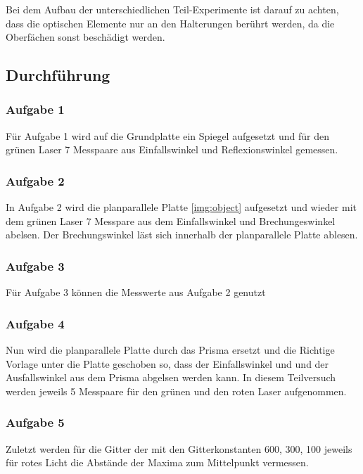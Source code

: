         \noindent
        Bei dem Aufbau der unterschiedlichen Teil-Experimente ist darauf zu achten, dass die optischen Elemente nur an den Halterungen berührt werden, 
        da die Oberfächen sonst beschädigt werden.

    \subsection{Durchführung}

        \subsubsection{Aufgabe 1}

            \noindent
            Für Aufgabe 1 wird auf die Grundplatte ein Spiegel aufgesetzt und für den grünen Laser 7 Messpaare aus Einfallswinkel und Reflexionswinkel
            gemessen.

        \subsubsection{Aufgabe 2}
            
            \noindent In Aufgabe 2 wird die planparallele Platte \ref{img:object} aufgesetzt und wieder mit dem grünen Laser 7 Messpare aus dem 
            Einfallswinkel und Brechungeswinkel abelsen. Der Brechungswinkel läst sich innerhalb der planparallele Platte ablesen.
        
        \subsubsection{Aufgabe 3}

            \noindent Für Aufgabe 3 können die Messwerte aus Aufgabe 2 genutzt

        \subsubsection{Aufgabe 4}

            \noindent Nun wird die planparallele Platte durch das Prisma ersetzt und die Richtige Vorlage unter die Platte geschoben so, dass der 
            Einfallswinkel und und der Ausfallswinkel aus dem Prisma abgelsen werden kann. In diesem Teilversuch werden jeweils 5 Messpaare für den 
            grünen und den roten Laser aufgenommen.

        \subsubsection{Aufgabe 5}

            \noindent Zuletzt werden für die Gitter der mit den Gitterkonstanten 600, 300, 100 jeweils für rotes Licht die Abstände der Maxima zum 
            Mittelpunkt vermessen.
        
        
